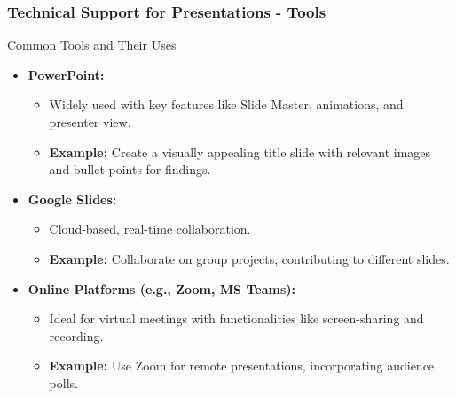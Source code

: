 \documentclass[aspectratio=169]{beamer}
\begin{document}
\begin{frame}[fragile]
    \frametitle{Technical Support for Presentations - Tools}
    \begin{block}{Common Tools and Their Uses}
        \begin{itemize}
            \item \textbf{PowerPoint:}
                \begin{itemize}
                    \item Widely used with key features like Slide Master, animations, and presenter view.
                    \item \textbf{Example:} Create a visually appealing title slide with relevant images and bullet points for findings.
                \end{itemize}
                
            \item \textbf{Google Slides:}
                \begin{itemize}
                    \item Cloud-based, real-time collaboration.
                    \item \textbf{Example:} Collaborate on group projects, contributing to different slides.
                \end{itemize}
                
            \item \textbf{Online Platforms (e.g., Zoom, MS Teams):}
                \begin{itemize}
                    \item Ideal for virtual meetings with functionalities like screen-sharing and recording.
                    \item \textbf{Example:} Use Zoom for remote presentations, incorporating audience polls.
                \end{itemize}
        \end{itemize}
    \end{block}
\end{frame}
\end{document}
